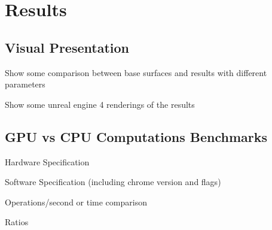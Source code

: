 \chapter{Results} \label{chap:results}

  \section {Visual Presentation} %
  
    \begin{notes}
      \item Show some comparison between base surfaces and results with different parameters
      \item Show some unreal engine 4 renderings of the results
    \end{notes}
  
  \section {GPU vs CPU Computations Benchmarks}
  
    \begin{notes}
      \item Hardware Specification
      \item Software Specification (including chrome version and flags)
      \item Operations/second or time comparison
      \item Ratios
    \end{notes}